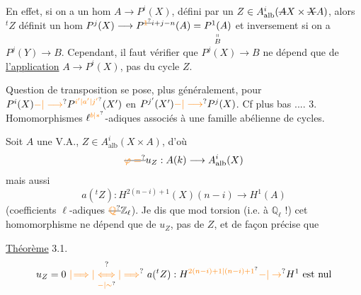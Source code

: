 En effet, si on a un hom
$A\longrightarrow P^i(X)$, défini par un $Z\in A^i_{\mathrm{alb}}(\deleted{A}X\times\deleted{X}A)$,
alors $ {}^t Z$ définit un hom $P^j(X)\longrightarrow P^{\deleted{\unsure{1}}i+j-n}(A)=\underset{\substack{\shortparallel\\B}}{P^1(A)}$
et inversement si on a $P^j(Y)\longrightarrow B$. 
Cependant, \margin{$\big|\big|\big|$}il faut vérifier que $P^j(X)\longrightarrow B$ ne dépend que
de \uline{l'application} $A\longrightarrow P^i(X)$, pas du cycle $Z$.

Question de transposition se pose, plus généralement, pour
$P^i(X)\unsure{-|\longrightarrow}P^{\unsure{i'|a'|j'}}(X')$ en $P^{j'}(X')\unsure{-|\longrightarrow}P^j(X)$.
Cf plus bas ....
3. Homomorphismes $\ell^{\unsure{b|*}}$-adiques associés à une
 famille abélienne de cycles.

Soit $A$ une V.A., $Z\in A^i_{\mathrm{alb}}(X\times A)$, d'où
\[
\deleted{\unsure{\varphi=}}u_Z:A(k)\longrightarrow A^i_{\mathrm{alb}}(X)
\]
mais aussi
\[
a({}^t Z):H^{2(n-i)+1}(X)(n-i)\longrightarrow H^1(A)
\]
(coefficients $\ell$-adiques $\deleted{\unsure{\mathbb Q}}\mathbb Z_\ell$). Je dis que
mod torsion (i.e. à  $\mathbb Q_\ell$ !) cet
homomorphisme ne dépend que de $u_Z$, pas de $Z$,
 et de façon précise que

\uline{Théorème} 3.1. 
\[
u_Z=0\ \overset{?}{\underset{\unsure{-|\sim}}{\unsure{\vert\!\Longrightarrow|\Longleftrightarrow|\Longrightarrow}}}\ a({}^t Z):H^{\unsure{2(n-i)+1|(n-i)+1}}\unsure{-|\to}H^1\ \text{est nul}
\]

